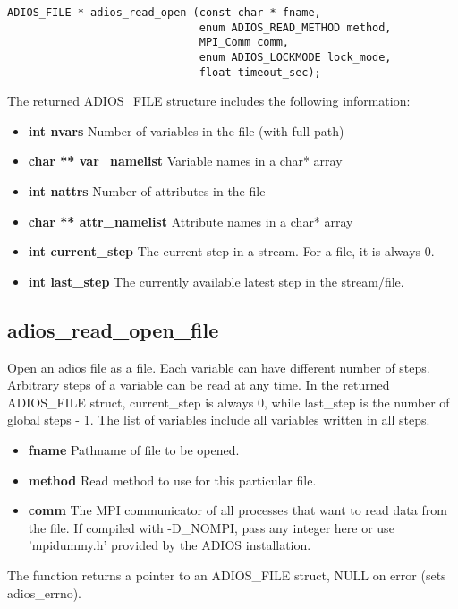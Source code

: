 \begin{lstlisting}[alsolanguage=C]
ADIOS_FILE * adios_read_open (const char * fname, 
                              enum ADIOS_READ_METHOD method, 
                              MPI_Comm comm, 
                              enum ADIOS_LOCKMODE lock_mode,
                              float timeout_sec);
\end{lstlisting}

\noindent The returned ADIOS\_FILE structure includes the following information:

\begin{itemize}
\item{\bf int nvars}   Number of variables in the file (with full path)
\item{\bf char ** var\_namelist}   Variable names in a char* array
\item{\bf int nattrs}  Number of attributes in the file
\item{\bf char ** attr\_namelist}  Attribute names in a char* array
\item{\bf int current\_step}  The current step in a stream. For a file, it is always 0. 
\item{\bf int last\_step}     The currently available latest step in the stream/file.  
\end{itemize}


\subsection{adios\_read\_open\_file}

Open an adios file as a file. Each variable can have different number of steps. Arbitrary steps of a variable
can be read at any time.  In the returned ADIOS\_FILE struct, current\_step is always 0, while last\_step is the number of global steps - 1. The list of variables include all variables written in all steps. 

\begin{itemize}
\item{\bf fname}    Pathname of file to be opened.
\item{\bf method}   Read method to use for this particular file.
\item{\bf comm}     The MPI communicator of all processes that want to read data from the file. If compiled with -D\_NOMPI, pass any integer here or use 'mpidummy.h' provided by the ADIOS installation. 
\end{itemize}

The function returns a pointer to an ADIOS\_FILE struct, NULL on error (sets adios\_errno). 

